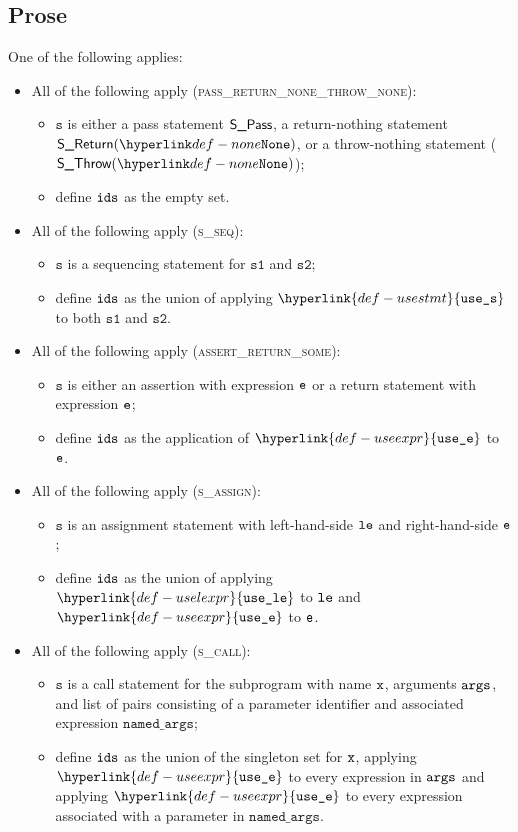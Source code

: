 \documentclass{book}
\newcommand\useexpr[0]{\hyperlink{def-useexpr}{\texttt{use\_e}}}
\newcommand\uselexpr[0]{\hyperlink{def-uselexpr}{\texttt{use\_le}}}
\newcommand\usestmt[0]{\hyperlink{def-usestmt}{\texttt{use\_s}}}
\newcommand\vs[0]{\texttt{s}}
\newcommand\vsone[0]{\texttt{s1}}
\newcommand\vstwo[0]{\texttt{s2}}
\newcommand\namedargs[0]{\texttt{named\_args}}
\begin{document}
\subsection{Prose}
One of the following applies:
\begin{itemize}
  \item All of the following apply (\textsc{pass\_return\_none\_throw\_none}):
  \begin{itemize}
    \item $\vs$ is either a pass statement $\textsf{S\_Pass}$, a return-nothing statement $\SReturn(\None)$,
          or a throw-nothing statement ($\SThrow(\None)$);
    \item define $\texttt{ids}$ as the empty set.
  \end{itemize}

  \item All of the following apply (\textsc{s\_seq}):
  \begin{itemize}
    \item $\vs$ is a sequencing statement for $\vsone$ and $\vstwo$;
    \item define $\texttt{ids}$ as the union of applying $\usestmt$ to both $\vsone$ and $\vstwo$.
  \end{itemize}

  \item All of the following apply (\textsc{assert\_return\_some}):
  \begin{itemize}
    \item $\vs$ is either an assertion with expression $\texttt{e}$ or a return statement with expression $\texttt{e}$;
    \item define $\texttt{ids}$ as the application of $\useexpr$ to $\texttt{e}$.
  \end{itemize}

  \item All of the following apply (\textsc{s\_assign}):
  \begin{itemize}
    \item $\vs$ is an assignment statement with left-hand-side $\texttt{le}$ and right-hand-side $\texttt{e}$;
    \item define $\texttt{ids}$ as the union of applying $\uselexpr$ to $\texttt{le}$ and $\useexpr$ to $\texttt{e}$.
  \end{itemize}

  \item All of the following apply (\textsc{s\_call}):
  \begin{itemize}
    \item $\vs$ is a call statement for the subprogram with name $\texttt{x}$, arguments $\texttt{args}$, and list of
          pairs consisting of a parameter identifier and associated expression $\namedargs$;
    \item define $\texttt{ids}$ as the union of the singleton set for $\texttt{x}$, applying $\useexpr$ to
          every expression in $\texttt{args}$ and applying $\useexpr$ to every expression associated with
          a parameter in $\namedargs$.
  \end{itemize}


\end{itemize}
\end{document}
